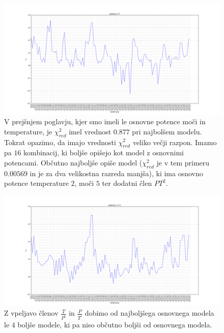 \documentclass[slovene,11pt,a4paper]{article}
\numberwithin{equation}{section} %
\numberwithin{figure}{section} %
\numberwithin{table}{section} %
\begin{document}
\begin{figure}
\begin{center}
\includegraphics[scale=0.5]{slike/samo_potence_log_tp.png}
\caption{V prejšnjem poglavju, kjer smo imeli le osnovne potence moči in temperature, je $\chi_{red}^2$ imel vrednost $0.877$ pri najbolšem modelu. Tokrat opazimo, da imajo vrednosti $\chi_{red}^2$ veliko večji razpon. Imamo pa $16$ kombinacij, ki boljše opišejo kot model z osnovnimi potencami. Občutno najboljše opiše model ($\chi_{red}^2$ je v tem primeru $0.00569$ in je za dva velikostna razreda manjša), ki ima osnovno potence temperature $2$, moči $5$ ter dodatni člen $PT^2$.}
\end{center}
\end{figure}

\begin{figure}
\begin{center}
\includegraphics[scale=0.5]{slike/samo_potence_log_ulomki.png}
\caption{Z vpeljavo členov $\frac{T}{P^i}$ in $\frac{P}{T^i}$ dobimo od najboljšega osnovnega modela le $4$ boljše modele, ki pa niso občutno boljši od osnovnega modela. }
\end{center}
\end{figure}
\end{document}
